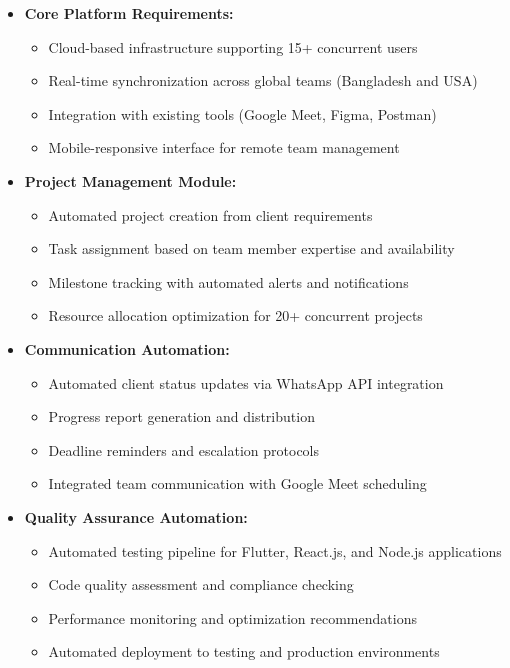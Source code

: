 \documentclass[12pt,a4paper]{article}
\begin{document}
\begin{itemize}
    \item \textbf{Core Platform Requirements:}
    \begin{itemize}
        \item Cloud-based infrastructure supporting 15+ concurrent users
        \item Real-time synchronization across global teams (Bangladesh and USA)
        \item Integration with existing tools (Google Meet, Figma, Postman)
        \item Mobile-responsive interface for remote team management
    \end{itemize}
    
    \item \textbf{Project Management Module:}
    \begin{itemize}
        \item Automated project creation from client requirements
        \item Task assignment based on team member expertise and availability
        \item Milestone tracking with automated alerts and notifications
        \item Resource allocation optimization for 20+ concurrent projects
    \end{itemize}
    
    \item \textbf{Communication Automation:}
    \begin{itemize}
        \item Automated client status updates via WhatsApp API integration
        \item Progress report generation and distribution
        \item Deadline reminders and escalation protocols
        \item Integrated team communication with Google Meet scheduling
    \end{itemize}
    
    \item \textbf{Quality Assurance Automation:}
    \begin{itemize}
        \item Automated testing pipeline for Flutter, React.js, and Node.js applications
        \item Code quality assessment and compliance checking
        \item Performance monitoring and optimization recommendations
        \item Automated deployment to testing and production environments
    \end{itemize}
\end{itemize}
\end{document}
